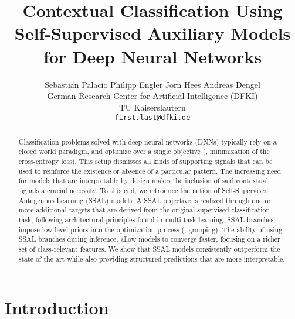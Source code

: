 \documentclass[10pt,twocolumn,letterpaper]{article}
\begin{document}
\title{Contextual Classification Using Self-Supervised Auxiliary Models for Deep Neural Networks}

\author{Sebastian Palacio \quad Philipp Engler \quad Jörn Hees \quad Andreas Dengel \\
German Research Center for Artificial Intelligence (DFKI)\\
TU Kaiserslautern \\
\texttt{first.last@dfki.de}}


\maketitle





\begin{abstract}
Classification problems solved with deep neural networks (DNNs) typically rely on a closed world paradigm, and optimize over a single objective (\eg, minimization of the cross-entropy loss).
This setup dismisses all kinds of supporting signals that can be used to reinforce the existence or absence of a particular pattern.
The increasing need for models that are interpretable by design makes the inclusion of said contextual signals a crucial necessity.
To this end, we introduce the notion of Self-Supervised Autogenous Learning (SSAL) models.
A SSAL objective is realized through one or more additional targets that are derived from the original supervised classification task, following architectural principles found in multi-task learning.
SSAL branches impose low-level priors into the optimization process (\eg, grouping).
The ability of using SSAL branches during inference, allow models to converge faster, focusing on a richer set of class-relevant features.
We show that SSAL models consistently outperform the state-of-the-art while also providing structured predictions that are more interpretable.
\end{abstract}




\section{Introduction}
\label{sec:introduction}
\end{document}
